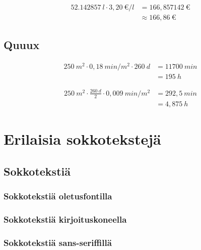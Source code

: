 \begin{align*}
52.142857\ l \cdot 3,20\ \text{€}/l &= 166,857142\ \text{€} \\
                                    &\approx 166,86\ \text{€}
\end{align*}


\chapter{Quuux}



\begin{align*}
250\ m^2 \cdot 0,18\ min/m^2 \cdot 260\ d &= 11700\ min \\
                                          &= 195\ h
\end{align*}




\begin{align*}
250\ m^2 \cdot \frac{260\ d}{2} \cdot 0,009\ min/m^2 &= 292,5\ min \\
                                                     &= 4,875\ h
\end{align*}


\part{Erilaisia sokkotekstejä}



\Blinddocument

\chapter{Sokkotekstiä}

\section{Sokkotekstiä oletusfontilla}

\Blindtext

\section{Sokkotekstiä kirjoituskoneella}

\texttt{\blindtext}


\section{Sokkotekstiä sans-seriffillä}


